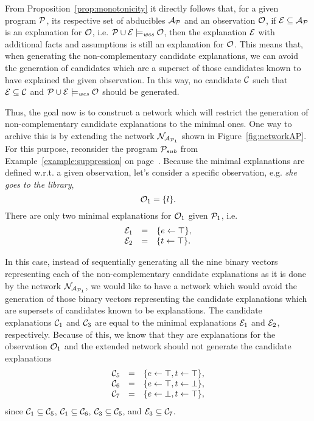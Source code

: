From Proposition~\ref{prop:monotonicity} it directly follows that, for a given program $\mathcal{P}$, its respective set of abducibles $\mathcal{A}_{\mathcal{P}}$ and an observation $\mathcal{O}$, if $\mathcal{E} \subseteq \mathcal{A}_{\mathcal{P}}$ is an explanation for $\mathcal{O}$, i.e. $\mathcal{P} \cup \mathcal{E} \models_{\normalfont\textit{wcs}} \mathcal{O}$, then the explanation $\mathcal{E}$ with additional facts and assumptions is still an explanation for $\mathcal{O}$. This means that, when generating the non-complementary candidate explanations, we can avoid the generation of candidates which are a superset of those candidates known to have explained the given observation. In this way, no candidate $\mathcal{C}$ such that $\mathcal{E} \subseteq \mathcal{C}$ and $\mathcal{P} \cup \mathcal{E} \models_{\normalfont\textit{wcs}} \mathcal{O}$ should be generated.

Thus, the goal now is to construct a network which will restrict the generation of non-complementary candidate explanations to the minimal ones. One way to archive this is by extending the network $\mathcal{N}_{\mathcal{A}_{\mathcal{P}_1}}$ shown in Figure~\ref{fig:networkAP}. For this purpose, reconsider the program $\mathcal{P}_{sub}$ from Example~\ref{example:suppression} on page~\pageref{example:suppression}. Because the minimal explanations are defined w.r.t. a given observation, let's consider a specific observation, e.g. \textit{she goes to the library},
\[
\mathcal{O}_1 = \{l\}.
\]
There are only two minimal explanations for $\mathcal{O}_1$ given $\mathcal{P}_1$, i.e. 
\[
\begin{array}{lcl}
\mathcal{E}_1 & = & \{e \leftarrow \top\}, \\
\mathcal{E}_2 & = & \{t \leftarrow \top\}. 
\end{array}
\]

In this case, instead of sequentially generating all the nine binary vectors representing each of the non-complementary candidate explanations as it is done by the network $\mathcal{N}_{\mathcal{A}_{\mathcal{P}_1}}$, we would like to have a network which would avoid the generation of those binary vectors representing the candidate explanations which are supersets of candidates known to be explanations. The candidate explanations $\mathcal{C}_1$ and $\mathcal{C}_3$ are equal to the minimal explanations $\mathcal{E}_1$ and $\mathcal{E}_2$, respectively. Because of this, we know that they are explanations for the observation $\mathcal{O}_1$ and the extended network should not generate the candidate explanations
\[
\begin{array}{lclclcl}
\mathcal{C}_5 &=& \{e \leftarrow \top, t \leftarrow \top\},\\
\mathcal{C}_6 &=& \{e \leftarrow \top, t \leftarrow \bot\},\\
\mathcal{C}_7 &=& \{e \leftarrow \bot, t \leftarrow \top\}, 
\end{array}
\]
since $\mathcal{C}_1 \subseteq \mathcal{C}_5$, $\mathcal{C}_1 \subseteq \mathcal{C}_6$, $\mathcal{C}_3 \subseteq \mathcal{C}_5$, and $\mathcal{E}_3 \subseteq \mathcal{C}_7$. 


